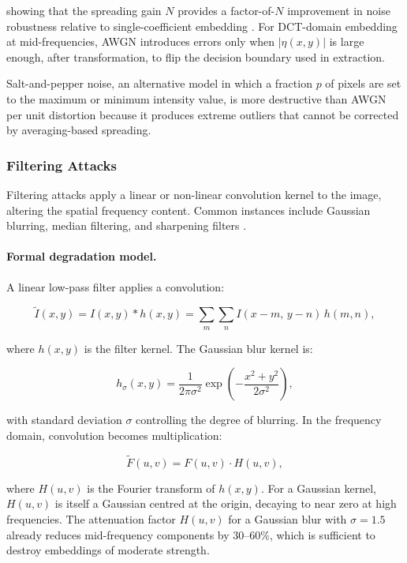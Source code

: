 \documentclass[12pt,a4paper,oneside]{report}
\begin{document}
	showing that the spreading gain $N$ provides a factor-of-$N$ improvement in noise robustness
	relative to single-coefficient embedding \cite{marvel1999spread}. For DCT-domain embedding
	at mid-frequencies, AWGN introduces errors only when $|\eta(x,y)|$ is large enough, after
	transformation, to flip the decision boundary used in extraction.
	
	Salt-and-pepper noise, an alternative model in which a fraction $p$ of pixels are set to
	the maximum or minimum intensity value, is more destructive than AWGN per unit distortion
	because it produces extreme outliers that cannot be corrected by averaging-based spreading.
	
	\subsubsection{Filtering Attacks}
	
	Filtering attacks apply a linear or non-linear convolution kernel to the image, altering the
	spatial frequency content. Common instances include Gaussian blurring, median filtering, and
	sharpening filters \cite{gonzalez2008digital}.
	
	\paragraph{Formal degradation model.}
	A linear low-pass filter applies a convolution:
	
	\begin{equation}
		\tilde{I}(x,y) = I(x,y) * h(x,y)
		= \sum_{m} \sum_{n} I(x-m,\, y-n)\, h(m,n),
		\label{eq:lpf}
	\end{equation}
	
	where $h(x,y)$ is the filter kernel. The Gaussian blur kernel is:
	
	\begin{equation}
		h_\sigma(x,y) = \frac{1}{2\pi\sigma^2}
		\exp\!\left(-\frac{x^2 + y^2}{2\sigma^2}\right),
		\label{eq:gaussian_kernel}
	\end{equation}
	
	with standard deviation $\sigma$ controlling the degree of blurring. In the frequency domain,
	convolution becomes multiplication:
	
	\begin{equation}
		\tilde{F}(u,v) = F(u,v) \cdot H(u,v),
		\label{eq:lpf_freq}
	\end{equation}
	
	where $H(u,v)$ is the Fourier transform of $h(x,y)$. For a Gaussian kernel, $H(u,v)$ is itself
	a Gaussian centred at the origin, decaying to near zero at high frequencies. The attenuation
	factor $H(u,v)$ for a Gaussian blur with $\sigma = 1.5$ already reduces mid-frequency components
	by $30$--$60\%$, which is sufficient to destroy embeddings of moderate strength.
	
\end{document}
